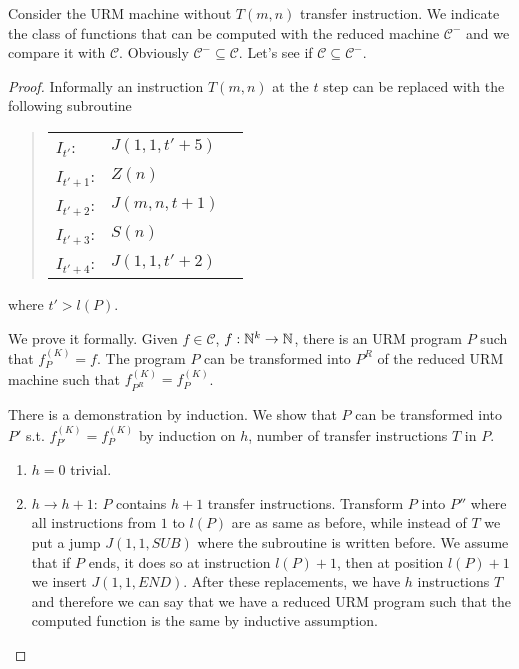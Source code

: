 \begin{exercise}
Consider the URM machine without $T(m, n)$ transfer instruction. We indicate the class
of functions that can be computed with the reduced machine $ \mathcal{C}^- $ and
we compare it with $ \mathcal{C} $. Obviously $ \mathcal{C}^- \subseteq \mathcal{C}
$. Let's see if $ \mathcal{C} \subseteq \mathcal{C}^-$. \\
\begin{proof}
Informally an instruction $T(m,n)$ at the $t$ step
can be replaced with the following subroutine
\begin{quote}
  \begin{tabular}{lll}
    $I_{t'}$:   & $J(1,1,t'+5)$  \\
    $I_{t'+1}$: & $Z(n)$        \\
    $I_{t'+2}$: & $J(m,n,t+1)$  \\
    $I_{t'+3}$: & $S(n)$        \\
    $I_{t'+4}$: & $J(1,1,t'+2)$ \\
  \end{tabular}
\end{quote}
where $t'>l(P)$.

We prove it formally. 
Given $ f \in \mathcal{C} $, $ f: \mathbb{N}^k \rightarrow \mathbb{N} $, there is an URM program $P$ such that $ f_P^{(K)}  = f$. The program $P$ can be transformed into $P ^R $ of the reduced URM machine such that $ f_{P^R}^{(K)}  = f_{P}^{(K)}$.

There is a demonstration by induction. We show that $P$ can be transformed into $P' $ s.t. $ f_{P'}^{(K)}  = f_{P}^{(K)} $ by induction on $h$, number of transfer instructions $T$ in $P$.

\begin{enumerate}
  \item $h = 0$ trivial.
  \item $h \rightarrow  h + 1$: $P$ contains $h + 1$ transfer instructions.
  Transform $P$ into $P''$ where all instructions from $1$ to $l(P)$ are as same as before, while instead of $T$ we put a jump $J(1,1, SUB)$ where the subroutine is written before. 
  We assume that if $P$ ends, it does so at instruction $l(P) + 1$, then at position $l(P) + 1$ we insert $J (1,1, END)$. 
  After these replacements, we have $h$ instructions $T$ and therefore we can say that we have a reduced URM program such that the computed function is the same by inductive assumption.
\end{enumerate}
\end{proof}
\end{exercise}

